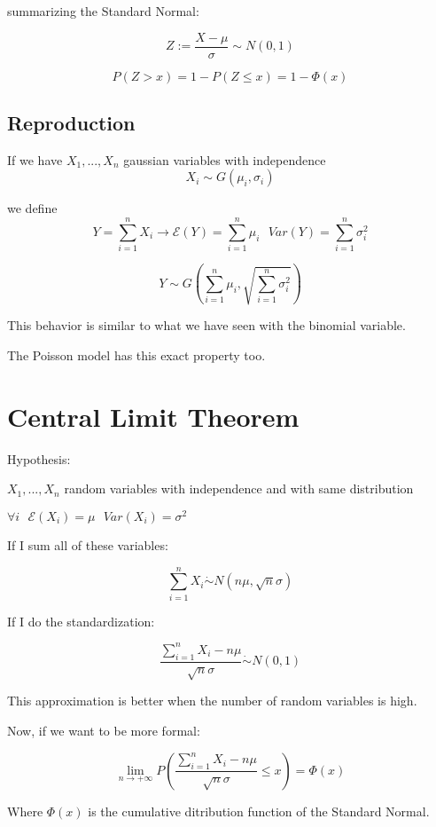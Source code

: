 \documentclass{article}
\begin{document}
\bigskip

summarizing the Standard Normal:

$$Z:= \frac{X -\mu}{\sigma} \sim N(0,1)$$

$$P(Z > x) = 1 - P(Z \leq x) = 1 - \Phi(x)$$

\subsection{Reproduction}

If we have $X_1,...,X_n$ gaussian variables with independence $$X_i \sim G(\mu_i,\sigma_i)$$

we define $$Y = \sum_{i=1}^n X_i \longrightarrow \mathcal E(Y) = \sum_{i=1}^n\mu_i \ \ \ Var(Y) = \sum_{i=1}^n \sigma_i^2$$

$$Y \sim G\left(\sum_{i=1}^n \mu_i, \sqrt{\sum_{i=1}^n \sigma_i^2}\right)$$

This behavior is similar to what we have seen with the binomial variable.

The Poisson model has this exact property too.

\section{Central Limit Theorem}

Hypothesis:

$X_1,...,X_n$ random variables with independence and with same distribution

$\forall i \ \ \ \mathcal E(X_i) = \mu \ \ \ Var(X_i) = \sigma^2$

\bigskip

If I sum all of these variables:

$$\sum_{i=1}^n X_i \dot \sim N(n\mu,\sqrt{n}\sigma)$$

\bigskip

\bigskip

If I do the standardization:

$$\frac{\sum_{i=1}^n X_i - n\mu}{\sqrt{n}\sigma} \dot \sim N(0,1)$$

This approximation is better when the number of random variables is high.

Now, if we want to be more formal:

$$\lim_{n \rightarrow +\infty} P\left(\frac{\sum_{i=1}^n X_i - n\mu}{\sqrt{n} \sigma} \leq x\right) = \Phi(x)$$

Where $\Phi(x)$ is the cumulative ditribution function of the Standard Normal.
\end{document}
